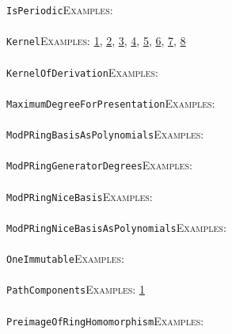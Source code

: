 \documentclass[a4paper,11pt]{report}
\begin{document}
{{ \texttt{IsPeriodic}{\nobreakspace}{\nobreakspace}{\nobreakspace}{\nobreakspace}\textsc{Examples:} \\
 \\
 \texttt{Kernel}{\nobreakspace}{\nobreakspace}{\nobreakspace}{\nobreakspace}\textsc{Examples:} \href{tutorial/chap10.html} {1}{\nobreakspace}, \href{../www/SideLinks/About/aboutCoefficientSequence.html} {2}{\nobreakspace}, \href{../www/SideLinks/About/aboutCohomologyRings.html} {3}{\nobreakspace}, \href{../www/SideLinks/About/aboutCrossedMods.html} {4}{\nobreakspace}, \href{../www/SideLinks/About/aboutDefinitions.html} {5}{\nobreakspace}, \href{../www/SideLinks/About/aboutSpaceGroup.html} {6}{\nobreakspace}, \href{../www/SideLinks/About/aboutIntro.html} {7}{\nobreakspace}, \href{../www/SideLinks/About/aboutTensorSquare.html} {8}{\nobreakspace} \\
 \\
 \texttt{KernelOfDerivation}{\nobreakspace}{\nobreakspace}{\nobreakspace}{\nobreakspace}\textsc{Examples:} \\
 \\
 \texttt{MaximumDegreeForPresentation}{\nobreakspace}{\nobreakspace}{\nobreakspace}{\nobreakspace}\textsc{Examples:} \\
 \\
 \texttt{ModPRingBasisAsPolynomials}{\nobreakspace}{\nobreakspace}{\nobreakspace}{\nobreakspace}\textsc{Examples:} \\
 \\
 \texttt{ModPRingGeneratorDegrees}{\nobreakspace}{\nobreakspace}{\nobreakspace}{\nobreakspace}\textsc{Examples:} \\
 \\
 \texttt{ModPRingNiceBasis}{\nobreakspace}{\nobreakspace}{\nobreakspace}{\nobreakspace}\textsc{Examples:} \\
 \\
 \texttt{ModPRingNiceBasisAsPolynomials}{\nobreakspace}{\nobreakspace}{\nobreakspace}{\nobreakspace}\textsc{Examples:} \\
 \\
 \texttt{OneImmutable}{\nobreakspace}{\nobreakspace}{\nobreakspace}{\nobreakspace}\textsc{Examples:} \\
 \\
 \texttt{PathComponents}{\nobreakspace}{\nobreakspace}{\nobreakspace}{\nobreakspace}\textsc{Examples:} \href{../www/SideLinks/About/aboutQuandles.html} {1}{\nobreakspace} \\
 \\
 \texttt{PreimageOfRingHomomorphism}{\nobreakspace}{\nobreakspace}{\nobreakspace}{\nobreakspace}\textsc{Examples:} \\
}}
\end{document}
